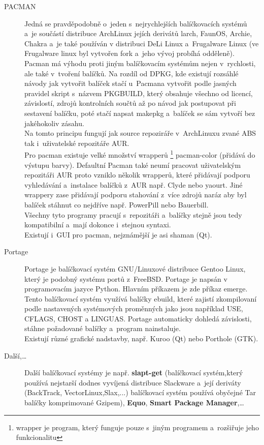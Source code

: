 \documentclass[a4paper,12pt]{article}
\renewcommand{\b}[1]{\textbf{#1}} %
\begin{document}
\begin{description}
 \item[PACMAN] Jedná se pravděpodobně o~jeden s~nejrychlejších balíčkovacích systémů a~je součástí distribuce ArchLinux jejích derivátů larch, FaunOS, Archie, Chakra a~je také používán v distribuci DeLi Linux a~Frugalware Linux (ve Frugalware linux byl vytvořen fork a~jeho vývoj probíhá odděleně). Pacman má výhodu proti jiným balíčkovacím systémům nejen v~rychlosti, ale také v~tvoření balíčků. Na rozdíl od DPKG, kde existují rozsáhlé návody jak vytvořit balíček stačí u~Pacmana vytvořit podle jasných pravidel skript s~názvem PKGBUILD, který obsahuje všechno od licencí, závislostí, zdrojů kontrolních součtů až po návod jak postupovat při sestavení balíčku, poté stačí napsat makepkg a~balíček se sám vytvoří bez jakéhokoliv zásahu.\\
Na tomto principu fungují jak source repoziráře v~ArchLinuxu zvané ABS tak i~uživatelské repozitáře AUR.\\
Pro pacman existuje velké množství wrapperů
\footnote{wrapper je program, který funguje pouze s~jiným programem a~rozšiřuje jeho funkcionalitu} pacman-color (přidává do výstupu barvy). Defaultní Pacman také neumí pracovat uživatelským repozitáři AUR proto vzniklo několik wrapperů, které přidávají podporu vyhledávání a~instalace balíčků z~AUR např. Clyde nebo yaourt. Jiné wrappery zase přidávají podporu stahování z~více zdrojů naráz aby byl balíček stáhnut co nejdříve např. PowerPill nebo Bauerbill.\\
Všechny tyto programy pracují s~repozitáři a~balíčky stejně jsou tedy kompatibilní a~mají dokonce i~stejnou syntaxi.\\
Existují i~GUI pro pacman, nejznámější je asi shaman (Qt).
 \item[Portage] Portage je balíčkovací systém GNU/Linuxové distribuce Gentoo Linux, který je podobný systému portů z~FreeBSD. Portage je napsán v programovacím jazyce Python. Hlavním příkazem je zde příkaz emerge. Tento balíčkovací systém využívá balíčky ebuild, které zajistí zkompilovaní podle nastavených systémových proměnných jako jsou například USE, CFLAGS, CHOST a LINGUAS. Portage automaticky dohledá závislosti, stáhne požadované balíčky a~program nainstaluje.\\
Existují různé grafické nadstavby, např. Kuroo (Qt) nebo Porthole (GTK).
 \item[Další,…] Další balíčkovací systémy je např. \b{slapt-get} (balíčkovací systém,který používá nejstarší dodnes vyvíjená distribuce Slackware a~její deriváty (BackTrack, VectorLinux,Slax,...) balíčkovací systém používá obyčejné Tar balíčky komprimované Gzipem), \b{Equo}, \b{Smart Package Manager},…
 \end{description}
\end{document}
